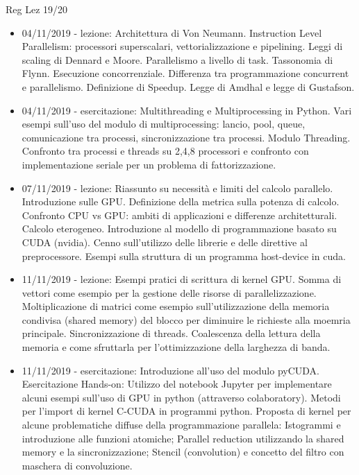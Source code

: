 \begin{frame}[allowframebreaks]{Reg Lez 19/20}

\begin{itemize}[resume]
\item 04/11/2019 - lezione: Architettura di Von Neumann. Instruction Level Parallelism: processori superscalari, vettorializzazione e pipelining. Leggi di scaling di Dennard e Moore. Parallelismo a livello di task. Tassonomia di Flynn. Esecuzione concorrenziale. Differenza tra programmazione concurrent e parallelismo. Definizione di Speedup. Legge di Amdhal e legge di Gustafson.
\item 04/11/2019 - esercitazione: Multithreading e Multiprocessing in Python. Vari esempi sull'uso del modulo di multiprocessing: lancio, pool, queue, comunicazione tra processi, sincronizzazione tra processi. Modulo Threading. Confronto tra processi e threads su 2,4,8 processori e confronto con implementazione seriale per un problema di fattorizzazione.
\item 07/11/2019 - lezione: Riassunto su necessità e limiti del calcolo parallelo. Introduzione sulle GPU. Definizione della metrica sulla potenza di calcolo. Confronto CPU vs GPU: ambiti di applicazioni e differenze architetturali. Calcolo eterogeneo. Introduzione al modello di programmazione basato su CUDA (nvidia). Cenno sull'utilizzo delle librerie e delle direttive al preprocessore. Esempi sulla struttura di un programma host-device in cuda.
\item 11/11/2019 - lezione: Esempi pratici di scrittura di kernel GPU. Somma di vettori come esempio per la gestione delle risorse di parallelizzazione. Moltiplicazione di matrici come esempio sull'utilizzazione della memoria condivisa (shared memory) del blocco per diminuire le richieste alla moemria principale. Sincronizzazione di threads. Coalescenza della lettura della memoria e come sfruttarla per l'ottimizzazione della larghezza di banda.
\item 11/11/2019 - esercitazione: Introduzione all'uso del modulo pyCUDA. Esercitazione Hands-on: Utilizzo del notebook Jupyter per implementare alcuni esempi sull'uso di GPU in python (attraverso colaboratory). Metodi per l'import di kernel C-CUDA in programmi python. Proposta di kernel per alcune problematiche diffuse della programmazione parallela: Istogrammi e introduzione alle funzioni atomiche; Parallel reduction utilizzando la shared memory e la sincronizzazione; Stencil (convolution) e concetto del filtro con maschera di convoluzione.
\end{itemize}


\end{frame}
